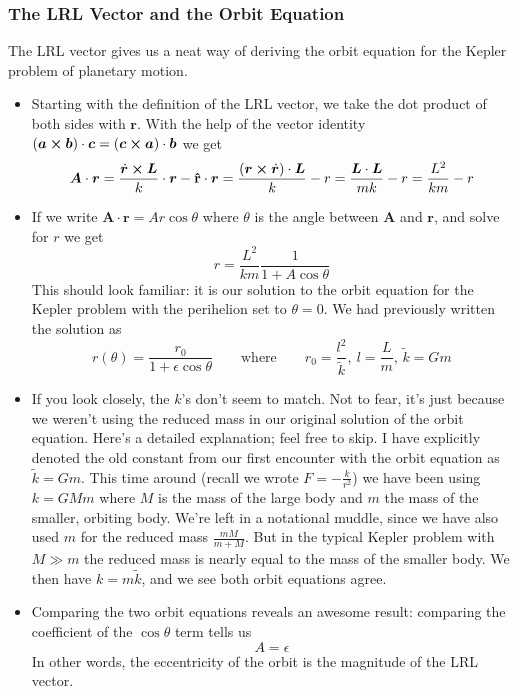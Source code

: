 \documentclass[11pt, a4paper]{article}
\newcommand{\eqtext}[1]{\qquad \text{#1} \qquad}
\newcommand{\bdot}[1]{\dot{\bm{#1}}} %
\newcommand{\uvec}[1]{\bm{\hat{\mathbf{#1}}}} %
\begin{document}
\subsubsection{The LRL Vector and the Orbit Equation}
The LRL vector gives us a neat way of deriving the orbit equation for the Kepler problem of planetary motion.
\begin{itemize}
	\item Starting with the definition of the LRL vector, we take the dot product of both sides with $ \bm{r} $. With the help of the vector identity $ (\bm{a} \cross \bm{b}) \cdot \bm{c} = (\bm{c} \cross \bm{a}) \cdot \bm{b}$ we get
	\begin{equation*}
		\bm{A}\cdot\bm{r} =  \frac{\bdot{r} \cross \bm{L}}{k}\cdot\bm{r} - \uvec{r} \cdot\bm{r} = \frac{(\bm{r} \cross \bdot{r})\cdot\bm{L}}{k} - r = \frac{\bm{L}\cdot\bm{L}}{mk} - r = \frac{L^{2}}{km} - r
	\end{equation*}
	
	\item If we write $ \bm{A} \cdot \bm{r} = A r \cos \theta $ where $ \theta $ is the angle between $ \bm{A} $ and $ \bm{r} $, and solve for $ r $ we get
	\begin{equation*}
		r = \frac{L^{2}}{km}\frac{1}{1 + A \cos \theta}
	\end{equation*}
	This should look familiar: it is our solution to the orbit equation for the Kepler problem with the perihelion set to $ \theta = 0 $. We had previously written the solution as
	\begin{equation*}
		r(\theta) = \frac{r_{0}}{1 + \epsilon \cos \theta} \eqtext{where} r_{0} = \frac{l^{2}}{\tilde{k}}, \ l = \frac{L}{m}, \, \tilde{k} = Gm
	\end{equation*}
	
	\item If you look closely, the $ k $'s don't seem to match. Not to fear, it's just because we weren't using the reduced mass in our original solution of the orbit equation. Here's a detailed explanation; feel free to skip. I have explicitly denoted the old constant from our first encounter with the orbit equation as $ \tilde{k} = Gm $. This time around (recall we wrote $ F = -\frac{k}{r^{2}} $) we have been using $ k = GMm $ where $ M $ is the mass of the large body and $ m $ the mass of the smaller, orbiting body. We're left in a notational muddle, since we have also used $ m $ for the reduced mass $ \frac{mM}{m + M} $. But in the typical Kepler problem with $ M \gg m $ the reduced mass is nearly equal to the mass of the smaller body. We then have $ k = m \tilde{k} $, and we see both orbit equations agree.
	
	\item Comparing the two orbit equations reveals an awesome result: comparing the coefficient of the $ \cos \theta $ term tells us
	\begin{equation*}
		A = \epsilon
	\end{equation*}
	In other words, the eccentricity of the orbit is the magnitude of the LRL vector.
\end{itemize}
\end{document}

